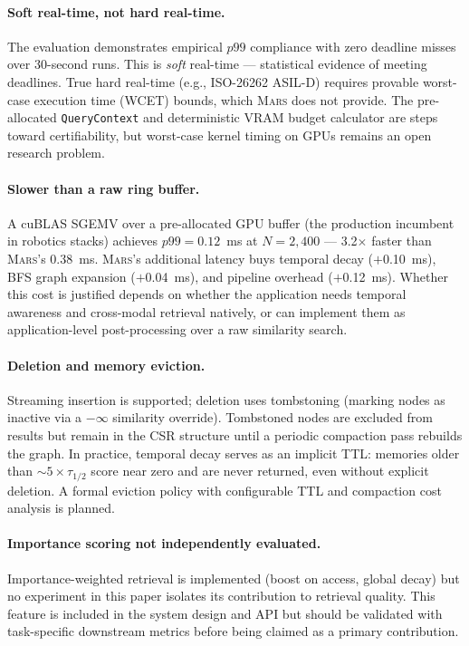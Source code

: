 \documentclass[11pt]{article}
\newcommand{\mars}{\textsc{Mars}}
\begin{document}
\paragraph{Soft real-time, not hard real-time.}
The evaluation demonstrates empirical $p99$ compliance with zero
deadline misses over 30-second runs. This is \emph{soft} real-time
--- statistical evidence of meeting deadlines. True hard real-time
(e.g., ISO-26262 ASIL-D) requires provable worst-case execution time
(WCET) bounds, which \mars{} does not provide. The pre-allocated
\texttt{QueryContext} and deterministic VRAM budget calculator are
steps toward certifiability, but worst-case kernel timing on GPUs
remains an open research problem.

\paragraph{Slower than a raw ring buffer.}
A cuBLAS SGEMV over a pre-allocated GPU buffer (the production
incumbent in robotics stacks) achieves $p99 = 0.12$~ms at
$N{=}2{,}400$ --- 3.2$\times$ faster than \mars{}'s 0.38~ms.
\mars{}'s additional latency buys temporal decay ($+$0.10~ms),
BFS graph expansion ($+$0.04~ms), and pipeline overhead ($+$0.12~ms).
Whether this cost is justified depends on whether the application
needs temporal awareness and cross-modal retrieval natively, or can
implement them as application-level post-processing over a raw
similarity search.

\paragraph{Deletion and memory eviction.}
Streaming insertion is supported; deletion uses tombstoning (marking
nodes as inactive via a $-\infty$ similarity override). Tombstoned
nodes are excluded from results but remain in the CSR structure until
a periodic compaction pass rebuilds the graph. In practice, temporal
decay serves as an implicit TTL: memories older than $\sim 5 \times
\tau_{1/2}$ score near zero and are never returned, even without
explicit deletion. A formal eviction policy with configurable TTL and
compaction cost analysis is planned.

\paragraph{Importance scoring not independently evaluated.}
Importance-weighted retrieval is implemented (boost on access,
global decay) but no experiment in this paper isolates its
contribution to retrieval quality. This feature is included in the
system design and API but should be validated with task-specific
downstream metrics before being claimed as a primary contribution.
\end{document}
